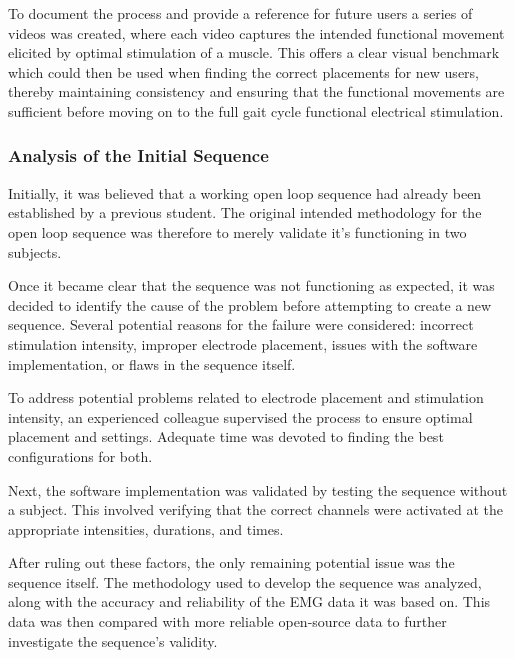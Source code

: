 To document the process and provide a reference for future users a series of videos was created, where each video captures the intended functional movement elicited by optimal stimulation of a muscle. This offers a clear visual benchmark which could then be used when finding the correct placements for new users, thereby maintaining consistency and ensuring that the functional movements are sufficient before moving on to the full gait cycle functional electrical stimulation.

\subsubsection{Analysis of the Initial Sequence}
Initially, it was believed that a working open loop sequence had already been established by a previous student. The original intended methodology for the open loop sequence was therefore to merely validate it's functioning in two subjects. 

Once it became clear that the sequence was not functioning as expected, it was decided to identify the cause of the problem before attempting to create a new sequence. Several potential reasons for the failure were considered: incorrect stimulation intensity, improper electrode placement, issues with the software implementation, or flaws in the sequence itself.

To address potential problems related to electrode placement and stimulation intensity, an experienced colleague supervised the process to ensure optimal placement and settings. Adequate time was devoted to finding the best configurations for both.

Next, the software implementation was validated by testing the sequence without a subject. This involved verifying that the correct channels were activated at the appropriate intensities, durations, and times.

After ruling out these factors, the only remaining potential issue was the sequence itself. The methodology used to develop the sequence was analyzed, along with the accuracy and reliability of the EMG data it was based on. This data was then compared with more reliable open-source data to further investigate the sequence's validity.


